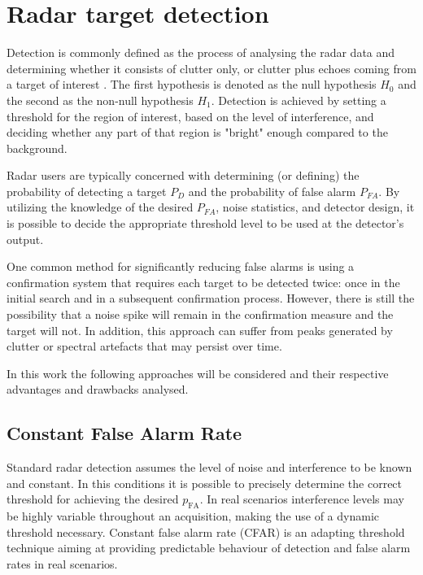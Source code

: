 \chapter{Radar target detection}
\label{chap:radar_detection}

Detection is commonly defined as the process of analysing the radar data and determining whether it consists of clutter only, or clutter plus echoes coming from a target of interest \cite{Richards_Scheer_Holm_2010}. 
The first hypothesis is denoted as the null hypothesis $H_0$ and the second as the non-null hypothesis $H_1$.
Detection is achieved by setting a threshold for the region of interest, based on the level of interference, and deciding whether any part of that region is "bright" enough compared to the background.


Radar users are typically concerned with determining (or defining) the probability of detecting a target $P_D$ and the probability of false alarm $P_{FA}$.  By utilizing the knowledge of the desired $P_{FA}$, noise statistics, and detector design, it is possible to decide the appropriate threshold level to be used at the detector's output.


One common method for significantly reducing false alarms is using a confirmation system that requires each target to be detected twice: once in the initial search and in a subsequent confirmation process.
However, there is still the possibility that a noise spike will remain in the confirmation measure and the target will not. In addition, this approach can suffer from peaks generated by clutter or spectral artefacts that may persist over time. 


In this work the following approaches will be considered and their respective advantages and drawbacks analysed.



\section{Constant False Alarm Rate}
	
	Standard radar detection assumes the level of noise and interference to be known and constant. In this conditions it is possible to precisely determine the correct threshold for achieving the desired $	p_\text{FA}$. In real scenarios interference levels may be highly variable throughout an acquisition, making the use of a dynamic threshold necessary. Constant false alarm rate (CFAR) is an adapting threshold technique aiming at providing predictable behaviour of detection and false alarm rates in real scenarios.
	
